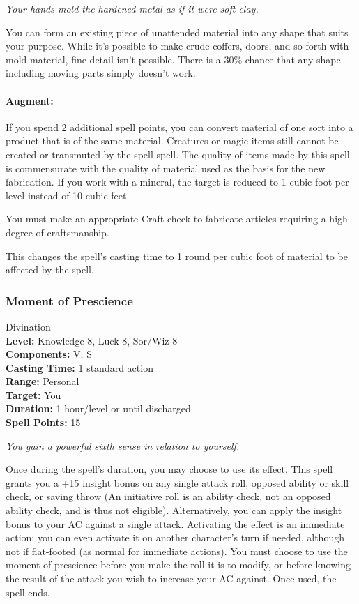 \emph{Your hands mold the hardened metal as if it were soft clay.}

You can form an existing piece of unattended material into any shape that suits your purpose. 
While it's possible to make crude coffers, doors, and so forth with mold material, fine detail isn't possible. 
There is a 30\% chance that any shape including moving parts simply doesn't work.

\paragraph{Augment:} If you spend 2 additional spell points, you can
convert material of one sort into a product that is of the same material.
Creatures or magic items still cannot be created or transmuted by the spell spell. 
The quality of items made by this spell is commensurate with the quality of material used as the basis for the new fabrication. 
If you work with a mineral, the target is reduced to 1 cubic foot per level instead of 10 cubic feet.

You must make an appropriate Craft check to fabricate articles requiring a high degree of craftsmanship.

This changes the spell's casting time to 1 round per cubic foot of material to be affected by the spell.
\subsubsection{Moment of Prescience}
\label{Spell:MomentOfPrescience}
Divination
\\ \textbf{Level:} Knowledge 8, Luck 8, Sor/Wiz 8
\\ \textbf{Components:} V, S
\\ \textbf{Casting Time:} 1 standard action
\\ \textbf{Range:} Personal
\\ \textbf{Target:} You
\\ \textbf{Duration:} 1 hour/level or until discharged
\\ \textbf{Spell Points:} 15

\emph{You gain a powerful sixth sense in relation to yourself.}

Once during the spell's duration, you may choose to use its effect. 
This spell grants you a +15 insight bonus on any single attack roll, 
opposed ability or skill check, or saving throw
(An initiative roll is an ability check, not an opposed ability check, and is thus not eligible).
Alternatively, you can apply the insight bonus to your AC against a single attack. 
Activating the effect is an immediate action; you can even activate it on another character's turn if needed, 
although not if flat-footed (as normal for immediate actions). 
You must choose to use the moment of prescience before you make the roll it is to modify, 
or before knowing the result of the attack you wish to increase your AC against. 
Once used, the spell ends.

